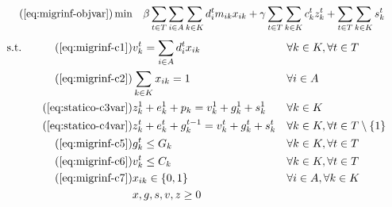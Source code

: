 \begin{align}
    \tag{\ref*{eq:migrinf-objvar}}
    \min\quad       & \beta \sum_{t \in T} \sum_{i \in A} \sum_{k \in K}{d^t_i m_{ik} x_{ik}} + \gamma \sum_{t \in T} \sum_{k \in K}{c_k^t z_k^t} + \sum_{t \in T} \sum_{k \in K}{s_k^t}
\end{align}
\vspace*{-6mm}
\begin{align}
    \text{s.t.\quad}
    \tag{\ref*{eq:migrinf-c1}}
    & v_k^t = \sum_{i \in A}{d^t_i x_{ik}}              &   & \forall k \in K, \forall t \in T                 \\
    \tag{\ref*{eq:migrinf-c2}}
    & \sum_{k \in K}{x_{ik}} = 1                        &   & \forall i \in A                                  \\
    \tag{\ref*{eq:statico-c3var}}
    & z_k^1 + e_k^1 + p_k = v_k^1 + g_k^1 + s_k^1       &   & \forall k \in K                                  \\
    \tag{\ref*{eq:statico-c4var}}
    & z_k^t + e_k^t + g_k^{t-1} = v_k^t + g_k^t + s_k^t &   & \forall k \in K, \forall t \in T \setminus \{1\} \\
    \tag{\ref*{eq:migrinf-c5}}
    & g_k^t \leq G_k                                    &   & \forall k \in K, \forall t \in T                 \\
    \tag{\ref*{eq:migrinf-c6}}
    & v_k^t \leq C_k                                    &   & \forall k \in K, \forall t \in T                 \\
    \tag{\ref*{eq:migrinf-c7}}
    & x_{ik} \in \{0,1\}                                &   & \forall i \in A, \forall k \in K                 \\
    \label{eq:statico-objvar}
    & x, g, s, v, z \geq 0                              &   &
\end{align}

